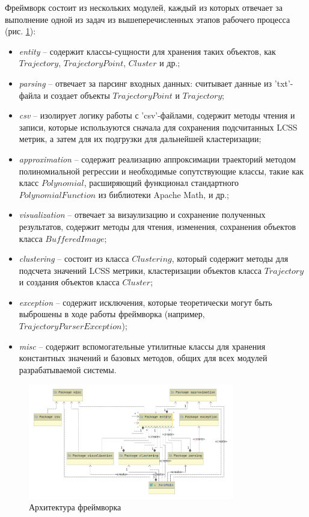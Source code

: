 Фреймворк состоит из нескольких модулей, каждый из которых отвечает за выполнение одной из задач из вышеперечисленных этапов рабочего процесса (рис. \ref{fig:proj-arch}):
\begin{itemize}
	\setlength\itemsep{-0.5em}
	\item \textit{entity} -- содержит классы-сущности для хранения таких объектов, как $Trajectory$, $TrajectoryPoint$, $Cluster$ и др.;
	\item \textit{parsing} -- отвечает за парсинг входных данных: считывает данные из 'txt'-файла и создает объекты $TrajectoryPoint$ и $Trajectory$;
	\item \textit{csv} -- изолирует логику работы с 'csv'-файлами, содержит методы чтения и записи, которые используются сначала для сохранения подсчитанных LCSS метрик, а затем для их подгрузки для дальнейшей кластеризации;
	\item \textit{approximation} -- содержит реализацию аппроксимации траекторий методом полиномиальной регрессии и необходимые сопутствующие классы, такие как класс $Polynomial$, расширяющий функционал стандартного $PolynomialFunction$ из библиотеки Apache Math, и др.;
	\item \textit{visualization} -- отвечает за визаулизацию и сохранение полученных результатов, содержит методы для чтения, изменения, сохранения объектов класса $BufferedImage$;
	\item \textit{clustering} -- состоит из класса $Clustering$, который содержит методы для подсчета значений LCSS метрики, кластеризации объектов класса $Trajectory$ и создания объектов класса $Cluster$;
	\item \textit{exception} -- содержит исключения, которые теоретически могут быть выброшены в ходе работы фреймворка (например, $TrajectoryParserException$);
	\item \textit{misc} -- содержит вспомогательные утилитные классы для хранения константных значений и базовых методов, общих для всех модулей разрабатываемой системы.
\end{itemize}

\begin{figure}[!htb]
	\centering{}
	\includegraphics[width=0.8\textwidth]{images/proj-arch.png}
	\caption{Архитектура фреймворка}
	\label{fig:proj-arch}
\end{figure}

